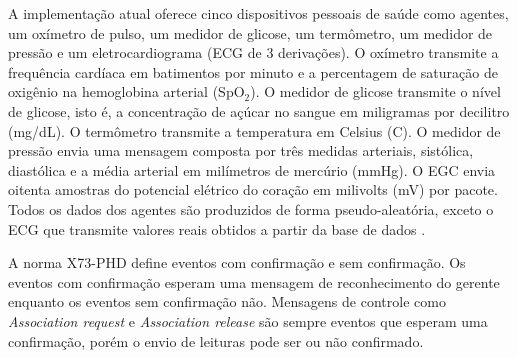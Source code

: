 A implementação atual oferece cinco dispositivos pessoais de saúde como agentes, um oxímetro de pulso, um medidor de glicose, um termômetro, um medidor de pressão e um eletrocardiograma (ECG de 3 derivações). O oxímetro transmite a frequência cardíaca em batimentos por minuto e a percentagem de saturação de oxigênio na hemoglobina arterial (SpO$_2$). O medidor de glicose transmite o nível de glicose, isto é, a concentração de açúcar no sangue em miligramas por decilitro (mg\//dL). O termômetro transmite a temperatura em Celsius (\textdegree C). O medidor de pressão envia uma mensagem composta por três medidas arteriais, sistólica, diastólica e a média arterial em milímetros de mercúrio (mmHg). O EGC envia oitenta amostras do potencial elétrico do coração em milivolts (mV) por pacote. 
Todos os dados dos agentes são produzidos de forma pseudo-aleatória, exceto o ECG que transmite valores reais obtidos a partir da base de dados \cite{b2}.

A norma X73-PHD define eventos com confirmação e sem confirmação. Os eventos com confirmação esperam uma mensagem de reconhecimento do gerente enquanto os eventos sem confirmação não. Mensagens de controle como \textit{Association request} e \textit{Association release} são sempre eventos que esperam uma confirmação, porém o envio de leituras pode ser ou não confirmado.


